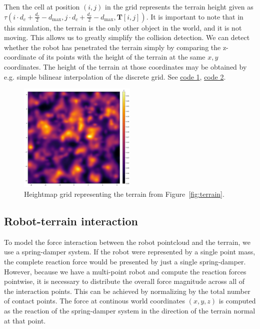 \documentclass[a4paper,12pt]{article}
\begin{document}
Then the cell at position $(i,j)$ in the grid represents the terrain height given as $\tau(i \cdot d_c + \frac{d_c}{2} - d_{\text{max}}, j \cdot d_c + \frac{d_c}{2} - d_{\text{max}}, \mathbf{T}\left[i,j\right])$. It is important to note that in this simulation, the terrain is the only other object in the world, and it is not moving. This allows us to greatly simplify the collision detection. We can detect whether the robot has penetrated the terrain simply by comparing the z-coordinate of its points with the height of the terrain at the same $x,y$ coordinates. The height of the terrain at those coordinates may be obtained by e.g. simple bilinear interpolation of the discrete grid. See \href{https://github.com/edavidk7/tracked_sim_rl/blob/main/configs/world_config.py}{code 1}, \href{https://github.com/edavidk7/tracked_sim_rl/blob/main/utils/environment.py}{code 2}. 

\begin{figure}[H]
  \centering
  \includegraphics[width=0.5\textwidth]{fig/terrain_grid.png}
  \caption{Heightmap grid representing the terrain from Figure~\ref{fig:terrain}.}
  \label{fig:terrain_grid}
\end{figure}

\subsection{Robot-terrain interaction}
\label{sec:interaction}

To model the force interaction between the robot pointcloud and the terrain, we use a spring-damper system. If the robot were represented by a single point mass, the complete reaction force would be presented by just a single spring-damper. However, because we have a multi-point robot and compute the reaction forces pointwise, it is necessary to distribute the overall force magnitude across all of the interaction points. This can be achieved by normalizing by the total number of contact points. The force at continous world coordinates $(x,y,z)$ is computed as the reaction of the spring-damper system in the direction of the terrain normal at that point. 
\end{document}
